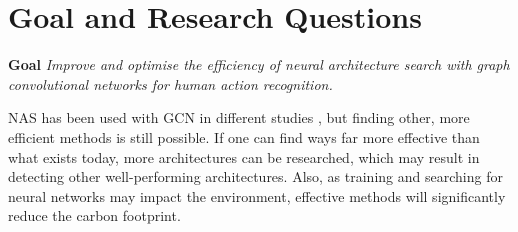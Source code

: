\begin{comment}
\textbf{Research Question 2} \textit{How does the relationship between zero-cost proxies and validation accuracy evolve during the warm-up phase of GCN training, and how early can we potentially halt the training process?}
\end{comment}
\begin{comment}
\textbf{Research Question 2} \textit{How does the correlation between zero-cost proxies and validation accuracy change during the warm-up phase, as GCN architectures are trained for up to 10 epochs? }

This research question investigates the relationship between zero-cost proxies and validation accuracy during the initial training phase (referred to as the warm-up phase) of GCN architectures. Specifically, it seeks to understand how the predictive power of zero-cost proxies evolves as architectures are trained for up to 10 epochs. 
\end{comment}

\begin{comment}
\textbf{Research question 3}\textit{ How will combining zero-cost proxies improve neural architecture search for GCN?}

Studies on zero-cost proxies on different computer vision tasks using CNN show that combining them may yield better performance than using them independently. Therefore, we will investigate how we can use an ensemble of zero-cost proxies in a neural architecture search for GCN. 


\textbf{Research question X} \textit{How can we effectively combine zero-cost proxies using various techniques, such as supervised learning, feature engineering, and weighted averaging, to enhance the efficiency and accuracy of architecture search in Neural Architecture Search (NAS) algorithms?}
\end{comment}
\section{Goal and Research Questions}\label{section:goalsandrq}

\textbf{Goal} \textit{Improve and optimise the efficiency of neural architecture search with graph convolutional networks for human action recognition.} 

NAS has been used with GCN in different studies \autocite{zhou2019auto, groos2022toward, peng2020learning}, but finding other, more efficient methods is still possible. If one can find ways far more effective than what exists today, more architectures can be researched, which may result in detecting other well-performing architectures. Also, as training and searching for neural networks may impact the environment, effective methods will significantly reduce the carbon footprint. 

